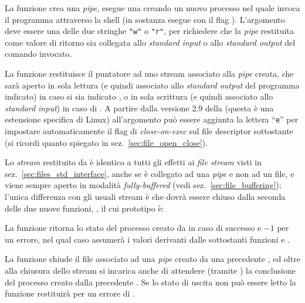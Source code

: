 La funzione crea una \textit{pipe}, esegue una  creando un nuovo
processo nel quale invoca il programma  attraverso la shell (in
sostanza esegue  con il flag ).
L'argomento  deve essere una delle due stringhe \verb|"w"| o
\verb|"r"|, per richiedere che la \textit{pipe} restituita come valore di
ritorno sia collegata allo \textit{standard input} o allo \textit{standard
  output} del comando invocato.

La funzione restituisce il puntatore ad uno stream associato alla
\textit{pipe} creata, che sarà aperto in sola lettura (e quindi associato allo
\textit{standard output} del programma indicato) in caso si sia indicato
, o in sola scrittura (e quindi associato allo \textit{standard
  input}) in caso di . A partire dalla versione 2.9 della 
(questa è una estensione specifica di Linux) all'argomento  può
essere aggiunta la lettera ``\texttt{e}'' per impostare automaticamente il
flag di \textit{close-on-exec} sul file descriptor sottostante (si ricordi
quanto spiegato in sez.~\ref{sec:file_open_close}).

Lo \textit{stream} restituito da  è identico a tutti gli effetti
ai \textit{file stream} visti in sez.~\ref{sec:files_std_interface}, anche se
è collegato ad una \textit{pipe} e non ad un file, e viene sempre aperto in
modalità \textit{fully-buffered} (vedi sez.~\ref{sec:file_buffering}); l'unica
differenza con gli usuali stream è che dovrà essere chiuso dalla seconda delle
due nuove funzioni, , il cui prototipo è:

\begin{funcproto}{
}

{La funzione ritorna lo stato del processo creato da  in caso di
  successo e $-1$ per un errore, nel qual caso  assumerà i valori
  derivanti dalle sottostanti funzioni  e .}
\end{funcproto}

La funzione chiude il file  associato ad una \textit{pipe}
creato da una precedente , ed oltre alla chiusura dello stream si
incarica anche di attendere (tramite ) la conclusione del processo
creato dalla precedente . Se lo stato di uscita non può essere
letto la funzione restituirà per  un errore di .


